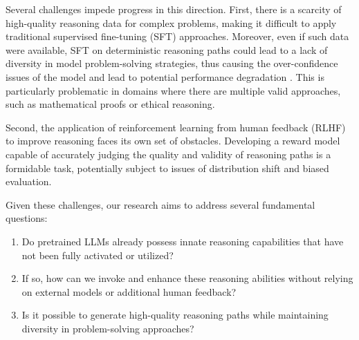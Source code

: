 Several challenges impede progress in this direction. First, there is a scarcity of high-quality reasoning data for complex problems, making it difficult to apply traditional supervised fine-tuning (SFT) approaches. Moreover, even if such data were available, SFT on deterministic reasoning paths could lead to a lack of diversity in model problem-solving strategies, thus causing the over-confidence issues of the model and lead to potential performance degradation \citep{cobbe2021training}. This is particularly problematic in domains where there are multiple valid approaches, such as mathematical proofs or ethical reasoning.

Second, the application of reinforcement learning from human feedback (RLHF) to improve reasoning faces its own set of obstacles. Developing a reward model capable of accurately judging the quality and validity of reasoning paths is a formidable task, potentially subject to issues of distribution shift and biased evaluation.

Given these challenges, our research aims to address several fundamental questions:
\begin{enumerate}
    \item Do pretrained LLMs already possess innate reasoning capabilities that have not been fully activated or utilized?
    \item If so, how can we invoke and enhance these reasoning abilities without relying on external models or additional human feedback?
    \item Is it possible to generate high-quality reasoning paths while maintaining diversity in problem-solving approaches? 
\end{enumerate}


